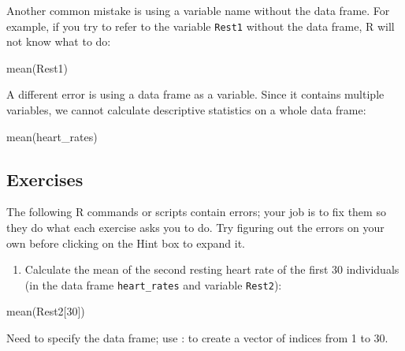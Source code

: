 \documentclass[
  letterpaper,
  DIV=11,
  numbers=noendperiod]{scrreprt}
\newenvironment{Shaded}{\begin{snugshade}}{\end{snugshade}}
\newcommand{\NormalTok}[1]{\textcolor[rgb]{0.00,0.23,0.31}{#1}}
\providecommand{\tightlist}{%
  \setlength{\itemsep}{0pt}\setlength{\parskip}{0pt}}\usepackage{longtable,booktabs,array}
\begin{document}
Another common mistake is using a variable name without the data frame.
For example, if you try to refer to the variable \texttt{Rest1} without
the data frame, R will not know what to do:

\begin{Shaded}
\begin{Highlighting}[]
\NormalTok{mean(Rest1)}
\end{Highlighting}
\end{Shaded}

A different error is using a data frame as a variable. Since it contains
multiple variables, we cannot calculate descriptive statistics on a
whole data frame:

\begin{Shaded}
\begin{Highlighting}[]
\NormalTok{mean(heart\_rates)}
\end{Highlighting}
\end{Shaded}

\hypertarget{exercises-10}{%
\subsection*{Exercises}\label{exercises-10}}

The following R commands or scripts contain errors; your job is to fix
them so they do what each exercise asks you to do. Try figuring out the
errors on your own before clicking on the Hint box to expand it.

\begin{enumerate}
\def\labelenumi{\arabic{enumi}.}
\tightlist
\item
  Calculate the mean of the second resting heart rate of the first 30
  individuals (in the data frame \texttt{heart\_rates} and variable
  \texttt{Rest2}):
\end{enumerate}

\begin{Shaded}
\begin{Highlighting}[]
\NormalTok{mean(Rest2[30])}
\end{Highlighting}
\end{Shaded}

\begin{tcolorbox}[enhanced jigsaw, arc=.35mm, colframe=quarto-callout-caution-color-frame, left=2mm, opacitybacktitle=0.6, breakable, title=\textcolor{quarto-callout-caution-color}{\faFire}\hspace{0.5em}{Hint}, toprule=.15mm, coltitle=black, bottomtitle=1mm, toptitle=1mm, colback=white, leftrule=.75mm, colbacktitle=quarto-callout-caution-color!10!white, titlerule=0mm, opacityback=0, rightrule=.15mm, bottomrule=.15mm]

Need to specify the data frame; use : to create a vector of indices from
1 to 30.

\end{tcolorbox}
\end{document}
